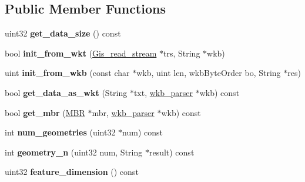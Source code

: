 \subsection*{Public Member Functions}
\begin{DoxyCompactItemize}
\item 
\mbox{\label{classGis__multi__point_a3b575998c70121f0f78e33b1925f79b5}} 
uint32 {\bfseries get\+\_\+data\+\_\+size} () const
\item 
\mbox{\label{classGis__multi__point_ac626d004e3691b93aa81adaa53d46427}} 
bool {\bfseries init\+\_\+from\+\_\+wkt} (\mbox{\hyperlink{classGis__read__stream}{Gis\+\_\+read\+\_\+stream}} $\ast$trs, String $\ast$wkb)
\item 
\mbox{\label{classGis__multi__point_aeb6df188fc6b4d704e96ad345ade8973}} 
uint {\bfseries init\+\_\+from\+\_\+wkb} (const char $\ast$wkb, uint len, wkb\+Byte\+Order bo, String $\ast$res)
\item 
\mbox{\label{classGis__multi__point_ac8b57eb19841ed6a84e941134e0da41e}} 
bool {\bfseries get\+\_\+data\+\_\+as\+\_\+wkt} (String $\ast$txt, \mbox{\hyperlink{classGeometry_1_1wkb__parser}{wkb\+\_\+parser}} $\ast$wkb) const
\item 
\mbox{\label{classGis__multi__point_a039412c711feba258f75345669bc3c58}} 
bool {\bfseries get\+\_\+mbr} (\mbox{\hyperlink{structMBR}{M\+BR}} $\ast$mbr, \mbox{\hyperlink{classGeometry_1_1wkb__parser}{wkb\+\_\+parser}} $\ast$wkb) const
\item 
\mbox{\label{classGis__multi__point_a152e533c816001508587283dcfa83903}} 
int {\bfseries num\+\_\+geometries} (uint32 $\ast$num) const
\item 
\mbox{\label{classGis__multi__point_aea315c4f99f1400b970de91d13589263}} 
int {\bfseries geometry\+\_\+n} (uint32 num, String $\ast$result) const
\item 
\mbox{\label{classGis__multi__point_a5afb975a609aa4964ee35d0aef945cd4}} 
uint32 {\bfseries feature\+\_\+dimension} () const
\item 

\end{DoxyCompactItemize}
